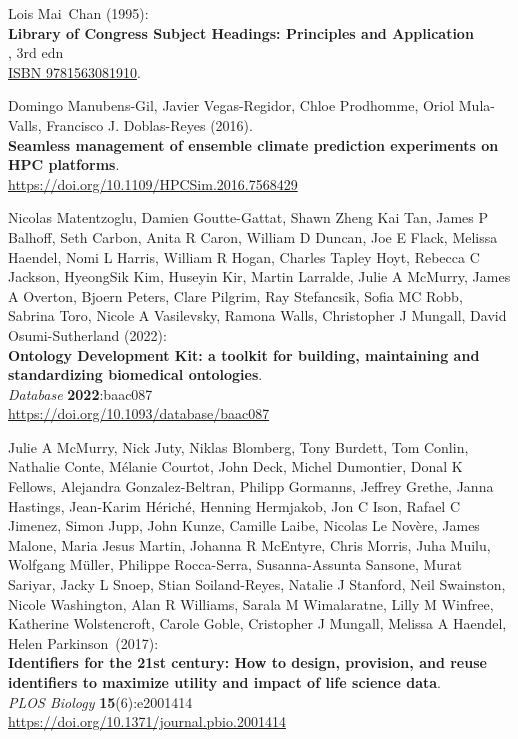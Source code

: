 \begin{thebibliography}{9}
Lois Mai~Chan (1995):\\
\textbf{Library of Congress Subject Headings: Principles and Application}\\, 3rd edn\\
\href{https://identifiers.org/isbn/9781563081910}{ISBN 9781563081910}.

Domingo Manubens-Gil, Javier Vegas-Regidor, Chloe Prodhomme, Oriol Mula-Valls, Francisco J. Doblas-Reyes (2016).\\
\textbf{Seamless management of ensemble climate prediction experiments on HPC platforms}.\\
\url{https://doi.org/10.1109/HPCSim.2016.7568429}

Nicolas Matentzoglu, Damien Goutte-Gattat, Shawn Zheng Kai Tan, James P Balhoff, Seth Carbon, Anita R Caron, William D Duncan, Joe E Flack, Melissa Haendel, Nomi L Harris, William R Hogan, Charles Tapley Hoyt, Rebecca C Jackson, HyeongSik Kim, Huseyin Kir, Martin Larralde, Julie A McMurry, James A Overton, Bjoern Peters, Clare Pilgrim, Ray Stefancsik, Sofia MC Robb, Sabrina Toro, Nicole A Vasilevsky, Ramona Walls, Christopher J Mungall, David Osumi-Sutherland (2022):\\
\textbf{Ontology Development Kit: a toolkit for building, maintaining and standardizing biomedical ontologies}.\\
\emph{Database} \textbf{2022}:baac087 \\
\url{https://doi.org/10.1093/database/baac087}

Julie A McMurry, Nick Juty, Niklas Blomberg, Tony
Burdett, Tom Conlin, Nathalie Conte, Mélanie Courtot, John Deck, Michel
Dumontier, Donal K Fellows, Alejandra Gonzalez-Beltran, Philipp
Gormanns, Jeffrey Grethe, Janna Hastings, Jean-Karim Hériché, Henning
Hermjakob, Jon C Ison, Rafael C Jimenez, Simon Jupp, John Kunze, Camille
Laibe, Nicolas Le Novère, James Malone, Maria Jesus Martin, Johanna R
McEntyre, Chris Morris, Juha Muilu, Wolfgang Müller, Philippe
Rocca-Serra, Susanna-Assunta Sansone, Murat Sariyar, Jacky L Snoep,
Stian Soiland-Reyes, Natalie J Stanford, Neil Swainston, Nicole
Washington, Alan R Williams, Sarala M Wimalaratne, Lilly M Winfree,
Katherine Wolstencroft, Carole Goble, Cristopher J Mungall, Melissa A
Haendel, Helen Parkinson~(2017):\\
\textbf{Identifiers for the 21st century: How to design, provision, and
reuse identifiers to maximize utility and impact of life science
data}.\\
\emph{PLOS Biology} \textbf{15}(6):e2001414\\
\url{https://doi.org/10.1371/journal.pbio.2001414}


\end{thebibliography}
